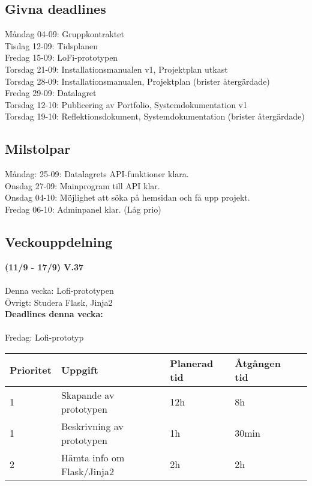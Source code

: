 \documentclass{TDP003mall}
\begin{document}
\subsection{Givna deadlines}
Måndag 04-09: Gruppkontraktet\\
Tisdag 12-09: Tidsplanen\\
Fredag 15-09: LoFi-prototypen\\
Torsdag 21-09: Installationsmanualen v1, Projektplan utkast\\
Torsdag 28-09: Installationsmanualen, Projektplan (brister återgärdade)\\
Fredag 29-09: Datalagret\\
Torsdag 12-10: Publicering av Portfolio, Systemdokumentation v1\\
Torsdag 19-10: Reflektionsdokument, Systemdokumentation (brister återgärdade)\\

\subsection{Milstolpar}
Måndag: 25-09: Datalagrets API-funktioner klara.\\
Onsdag 27-09: Mainprogram till API klar.\\
Onsdag 04-10: Möjlighet att söka på hemsidan och få upp projekt.\\
Fredag 06-10: Adminpanel klar. (Låg prio)\\

\subsection{Veckouppdelning}
\textbf{(11/9 - 17/9) V.37}\\\\
Denna vecka: Lofi-prototypen\\
Övrigt: Studera Flask, Jinja2\\

\textbf{Deadlines denna vecka: }\\\\
Fredag: Lofi-prototyp

\begin{table}[]
  \begin{tabular}{|l|l|l|l|l|}
  \hline
   Prioritet & Uppgift                    & Planerad tid & Åtgången tid \\ \hline
   1         & Skapande av prototypen     & 12h          & 8h           \\ \hline
   1         & Beskrivning av prototypen  & 1h           & 30min        \\ \hline
   2         & Hämta info om Flask/Jinja2 & 2h           & 2h           \\ \hline
  \end{tabular}
  \end{table}
\end{document}
